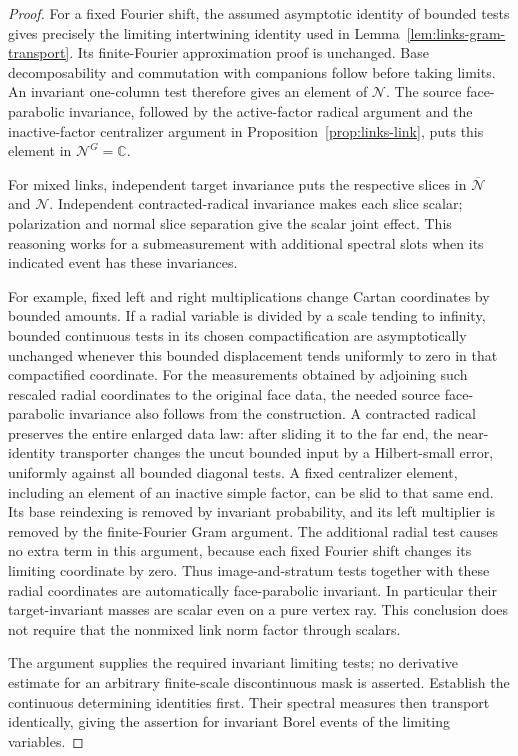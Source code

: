 \begin{proof}
For a fixed Fourier shift, the assumed asymptotic identity of
bounded tests gives precisely the limiting intertwining identity
used in Lemma~\ref{lem:links-gram-transport}. Its finite-Fourier
approximation proof is unchanged. Base decomposability and
commutation with companions follow before taking limits. An
invariant one-column test therefore gives an element of
\(\mathcal N\). The source face-parabolic invariance, followed
by the active-factor radical argument and the inactive-factor
centralizer argument in Proposition~\ref{prop:links-link}, puts
this element in \(\mathcal N^G=\mathbb C\).

For mixed links, independent target invariance puts the respective
slices in \(\overline{\mathcal N}\) and \(\mathcal N\).
Independent contracted-radical invariance makes each slice scalar;
polarization and normal slice separation give the scalar joint
effect. This reasoning works for a submeasurement with additional
spectral slots when its indicated event has these invariances.

For example, fixed left and right multiplications change Cartan
coordinates by bounded amounts. If a radial variable is divided
by a scale tending to infinity, bounded continuous tests in its
chosen compactification are asymptotically unchanged whenever this
bounded displacement tends uniformly to zero in that compactified
coordinate. For the measurements obtained by adjoining such
rescaled radial coordinates to the original face data, the needed
source face-parabolic invariance also follows from the construction.
A contracted radical preserves the entire enlarged data law: after
sliding it to the far end, the near-identity transporter changes
the uncut bounded input by a Hilbert-small error, uniformly against
all bounded diagonal tests. A fixed centralizer element, including
an element of an inactive simple factor, can be slid to that same
end. Its base reindexing is removed by invariant probability, and
its left multiplier is removed by the finite-Fourier Gram argument.
The additional radial test causes no extra term in this argument,
because each fixed Fourier shift changes its limiting coordinate
by zero. Thus image-and-stratum tests together with these radial
coordinates are automatically face-parabolic invariant. In
particular their target-invariant masses are scalar even on a
pure vertex ray. This conclusion does not require that the
nonmixed link norm factor through scalars.

The argument supplies the required invariant limiting tests; no
derivative estimate for an arbitrary finite-scale discontinuous
mask is asserted. Establish the continuous determining identities
first. Their spectral measures then transport identically, giving
the assertion for invariant Borel events of the limiting
variables.
\end{proof}

